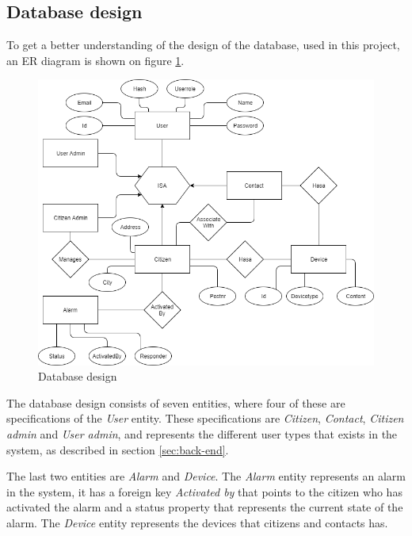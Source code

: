 \subsection{Database design}\label{sec:databasedesign}
To get a better understanding of the design of the database, used in this project, an ER diagram is shown on figure \ref{fig:database}.

\begin{figure}[H]
    \centering
    \includegraphics[width=1.0\textwidth]{Figures/Database.png}
    \caption{Database design}
    \label{fig:database}
\end{figure}

The database design consists of seven entities, where four of these are specifications of the \textit{User} entity. These specifications are \textit{Citizen}, \textit{Contact}, \textit{Citizen admin} and \textit{User admin}, and represents the different user types that exists in the system, as described in section \ref{sec:back-end}. 

The last two entities are \textit{Alarm} and \textit{Device}. The \textit{Alarm} entity represents an alarm in the system, it has a foreign key \textit{Activated by} that points to the citizen who has activated the alarm and a status property that represents the current state of the alarm. The \textit{Device} entity represents the devices that citizens and contacts has.
